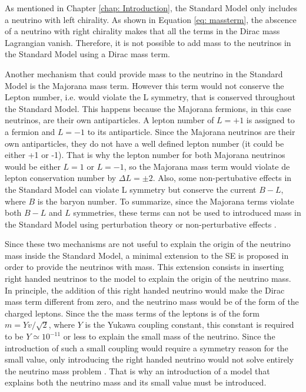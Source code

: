 As mentioned in Chapter \ref{chap: Introduction}, the Standard Model only includes a neutrino with left chirality. As shown in Equation \ref{eq: massterm}, the abscence of a neutrino with right chirality makes that all the terms in the Dirac mass Lagrangian vanish. Therefore, it is not possible to add mass to the neutrinos in the Standard Model using a Dirac mass term.

Another mechanism that could provide mass to the neutrino in the Standard Model is the Majorana mass term. However this term would not conserve the Lepton number, i.e. would violate the L symmetry, that is conserved throughout the Standard Model\cite{NeutrinoMass2}. This happens because the Majorana fermions, in this case neutrinos, are their own antiparticles. A lepton number of $L = +1$ is assigned to a fermion and $L = -1$ to its antiparticle. Since the Majorana neutrinos are their own antiparticles, they do not have a well defined lepton number (it could be either +1 or -1). That is why the lepton number for both Majorana neutrinos would be either $L = 1$ or $L = -1$, so the Majorana mass term would violate de lepton conservation number by $\Delta L = \pm 2$. Also, some non-pertubative effects in the Standard Model can violate L symmetry but conserve the current $B - L$, where $B$ is the baryon number. To summarize, since the Majorana terms violate both $B-L$ and $L$ symmetries, these terms can not be used to introduced mass in the Standard Model using perturbation theory or non-perturbative effects \cite{NeutrinoMass2}.  

Since these two mechanisms are not useful to explain the origin of the neutrino mass inside the Standard Model, a minimal extension to the SE is proposed in order to provide the neutrinos with mass. This extension consists in inserting right handed neutrinos to the model to explain the origin of the neutrino mass. In principle, the addition of this right handed neutrino would make the Dirac mass term different from zero, and the neutrino mass would be of the form of the charged leptons. Since the the mass terms of the leptons is of the form $m = Yv/\sqrt{2}$, where $Y$ is the Yukawa coupling constant, this constant is required to be $Y \simeq 10^{-11}$ or less to explain the small mass of the neutrino. Since the introduction of such a small coupling would require a symmetry reason for the small value, only introducing the right handed neutrino would not solve entirely the neutrino mass problem \cite{YukawaCoupling}. That is why an introduction of a model that explains both the neutrino mass and its small value must be introduced.

